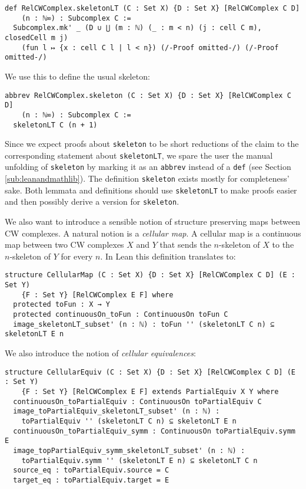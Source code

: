 \begin{lstlisting}[frame=single]
def RelCWComplex.skeletonLT (C : Set X) {D : Set X} [RelCWComplex C D] 
    (n : ℕ∞) : Subcomplex C :=
  Subcomplex.mk' _ (D ∪ ⋃ (m : ℕ) (_ : m < n) (j : cell C m), closedCell m j)
    (fun l ↦ {x : cell C l | l < n}) (/-Proof omitted-/) (/-Proof omitted-/)
\end{lstlisting}

We use this to define the usual skeleton: 

\begin{lstlisting}[frame=single]
abbrev RelCWComplex.skeleton (C : Set X) {D : Set X} [RelCWComplex C D] 
    (n : ℕ∞) : Subcomplex C :=
  skeletonLT C (n + 1)
\end{lstlisting}

Since we expect proofs about \lstinline|skeleton| to be short reductions of the claim to the corresponding statement about \lstinline|skeletonLT|, we spare the user the manual unfolding of \lstinline|skeleton| by marking it as an \lstinline|abbrev| instead of a \lstinline|def| (see Section \ref{sub:leanandmathlib}).
The definition \lstinline|skeleton| exists mostly for completeness' sake. 
Both lemmata and definitions should use \lstinline|skeletonLT| to make proofs easier and then possibly derive a version for \lstinline|skeleton|.


We also want to introduce a sensible notion of structure preserving maps between CW complexes.
A natural notion is a \emph{cellular map}. 
A cellular map is a continuous map between two CW complexes $X$ and $Y$ that sends the $n$-skeleton of $X$ to the $n$-skeleton of $Y$ for every $n$.
In Lean this definition translates to: 

\begin{lstlisting}[frame=single]
structure CellularMap (C : Set X) {D : Set X} [RelCWComplex C D] (E : Set Y) 
    {F : Set Y} [RelCWComplex E F] where
  protected toFun : X → Y
  protected continuousOn_toFun : ContinuousOn toFun C
  image_skeletonLT_subset' (n : ℕ) : toFun '' (skeletonLT C n) ⊆ skeletonLT E n
\end{lstlisting}

We also introduce the notion of \emph{cellular equivalences}: 

\begin{lstlisting}[frame=single]
structure CellularEquiv (C : Set X) {D : Set X} [RelCWComplex C D] (E : Set Y) 
    {F : Set Y} [RelCWComplex E F] extends PartialEquiv X Y where
  continuousOn_toPartialEquiv : ContinuousOn toPartialEquiv C
  image_toPartialEquiv_skeletonLT_subset' (n : ℕ) :
    toPartialEquiv '' (skeletonLT C n) ⊆ skeletonLT E n
  continuousOn_toPartialEquiv_symm : ContinuousOn toPartialEquiv.symm E
  image_topPartialEquiv_symm_skeletonLT_subset' (n : ℕ) :
    toPartialEquiv.symm '' (skeletonLT E n) ⊆ skeletonLT C n
  source_eq : toPartialEquiv.source = C
  target_eq : toPartialEquiv.target = E
\end{lstlisting}

